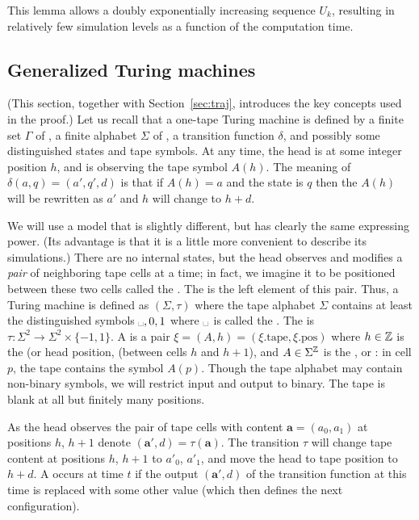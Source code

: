 \documentclass[11pt]{memoir}
\theoremstyle{definition} %
\renewcommand{\vek}[1]{\mathbf{#1}}
\def\U{U}
\newcommand{\va}{\vek{a}} %
\newcommand{\blank}{\text{\textvisiblespace}}
\newcommand{\h}{h} %
\newcommand{\pos}{\mathrm{pos}}
\newcommand{\tape}{\mathrm{tape}}
\begin{document}
This lemma allows a doubly exponentially increasing sequence \( \U_{k} \), resulting
in relatively few simulation levels as a function of the computation time.


\subsection{Generalized Turing machines}\label{sec:TM}

(This section, together with Section~\ref{sec:traj},
introduces the key concepts used in the proof.)
Let us recall that a one-tape Turing machine is defined by a
finite set \( \Gamma \) of ,
a finite alphabet \( \Sigma \) of , a transition function \( \delta \),
and possibly some distinguished states and tape symbols.
At any time, the head is at some integer position \( \h \), and is observing the tape
symbol \( A(\h) \).
The meaning of \( \delta(a,q)=(a',q',d) \) is that if \( A(\h)=a \) and the state is \( q \) then
the \( A(\h) \) will be rewritten as \( a' \) and \( \h \) will change to \( \h+d \).

We will use a model that is slightly different, but has clearly the same expressing power.
(Its advantage is that it is a little more convenient to describe its simulations.)
There are no internal states, but the head observes and modifies a \emph{pair} of
neighboring tape cells at a time; in fact, we imagine it to be positioned between these
two cells called the .
The  is the left element of this pair.
Thus, a Turing machine is defined as \(    (\Sigma,\tau) \) where
the tape alphabet \( \Sigma \) contains at least the distinguished
symbols \( \blank,0,1 \) where \( \blank \) is called the .
The  is
\(  \tau\colon\Sigma^{2}\to \Sigma^{2}\times\{-1,1\} \).
A  is a pair \( \xi = (A,\h) = (\xi.\tape,\xi.\pos) \)
where  \( \h\in\bbZ \) is the  (or 
head position, (between cells \( h \) and \( h+1 \)),
and \( A\in\Sigma^{\mathbb{Z}} \) is the , or :
in cell \( p \), the tape contains the symbol \( A(p) \).
Though the tape alphabet may contain
non-binary symbols, we will restrict input and output to binary.
The tape is blank at all but finitely many positions.

As the head observes the pair of tape cells
with content \( \va=(a_{0},a_{1}) \) at positions \( \h \), \( \h+1 \) denote \(  (\va',d)=\tau(\va)  \).
The transition \( \tau \) will
change tape content at positions \( \h \), \( \h+1 \) to \( a'_{0} \), \( a'_{1} \),
and move the head to tape position to \( \h+d \).
A  occurs at time \( t \) if the output \( (\va',d) \)
of the    transition function at this time is replaced with some other value
(which then defines the next configuration).
\end{document}
